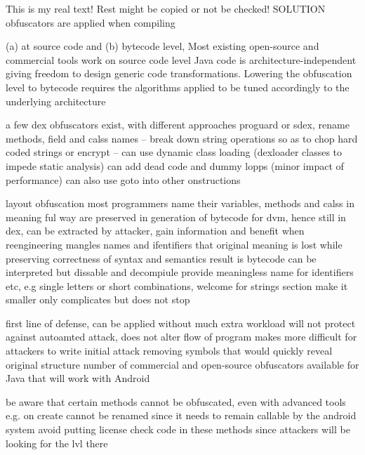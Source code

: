 This is my real text! Rest might be copied or not be checked!
SOLUTION
obfuscators are applied when compiling

%
(a) at source code and (b) bytecode level, Most existing open-source and commercial tools work on source code level\newline
Java code is architecture-independent giving freedom to design generic code transformations. Lowering the obfuscation level to bytecode requires the algorithms applied to be tuned accordingly to the underlying architecture\newline
\cite{kovachevaMaster}
%

%
a few dex obfuscators exist, with different approaches
proguard or sdex, rename methods, field and calss names -- break down string operations so as to chop hard coded strings or encrypt -- can use dynamic class loading (dexloader classes to impede static analysis)
can add dead code and dummy lopps (minor impact of performance)
can also use goto into other onstructions

\cite{andevconDalvikART}
%


%

layout obfuscation
most programmers name their variables, methods and calss in meaning ful way
are preserved in generation of bytecode for dvm, hence still in dex, can be extracted by attacker, gain information and benefit when reengineering
mangles names and ifentifiers that original meaning is lost while preserving correctness of syntax and semantics
result is bytecode can be interpreted but dissable and decompiule provide meaningless name for identifiers etc, e.g single letters or short combinations, welcome for strings section make it smaller
only complicates but does not stop


\cite{munteanLicense}
%

%
first line of defense, can be applied without much extra workload
will not protect against autoamted attack, does not alter flow of program
makes more difficult for attackers to write initial attack
removing symbols that would quickly reveal original structure
number of commercial and open-source obfuscators available for Java that will work with Android

be aware that certain methods cannot be obfuscated, even with advanced tools
e.g. on create cannot be renamed since it needs to remain callable by the android system
avoid putting license check code in these methods since attackers will be looking for the lvl there
\cite{developersSecuring}
%


